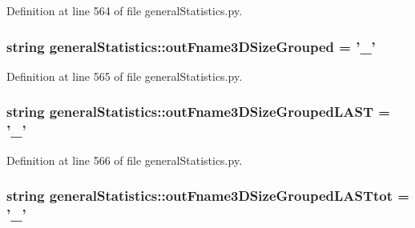 \-Definition at line 564 of file general\-Statistics.\-py.

\hypertarget{namespacegeneral_statistics_a0f53a86c9390e90115eaa38967ac1eab}{
\subsubsection[{out\-Fname3\-D\-Size\-Grouped}]{\setlength{\rightskip}{0pt plus 5cm}string {\bf general\-Statistics\-::out\-Fname3\-D\-Size\-Grouped} = '{\bf \-\_\-}'}}\label{namespacegeneral_statistics_a0f53a86c9390e90115eaa38967ac1eab}


\-Definition at line 565 of file general\-Statistics.\-py.

\hypertarget{namespacegeneral_statistics_a41b8a01562c7b02335cd9693c3e23742}{
\subsubsection[{out\-Fname3\-D\-Size\-Grouped\-L\-A\-S\-T}]{\setlength{\rightskip}{0pt plus 5cm}string {\bf general\-Statistics\-::out\-Fname3\-D\-Size\-Grouped\-L\-A\-S\-T} = '{\bf \-\_\-}'}}\label{namespacegeneral_statistics_a41b8a01562c7b02335cd9693c3e23742}


\-Definition at line 566 of file general\-Statistics.\-py.

\hypertarget{namespacegeneral_statistics_ade201b7fa63723879eab1912ec6e0f48}{
\subsubsection[{out\-Fname3\-D\-Size\-Grouped\-L\-A\-S\-Ttot}]{\setlength{\rightskip}{0pt plus 5cm}string {\bf general\-Statistics\-::out\-Fname3\-D\-Size\-Grouped\-L\-A\-S\-Ttot} = '{\bf \-\_\-}'}}\label{namespacegeneral_statistics_ade201b7fa63723879eab1912ec6e0f48}


